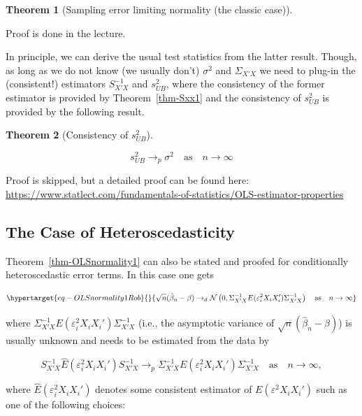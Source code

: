 \documentclass[
  letterpaper,
  DIV=11,
  numbers=noendperiod]{scrreprt}
\theoremstyle{definition}
\theoremstyle{plain}
\newtheorem{theorem}{Theorem}[chapter]
\theoremstyle{plain}
\theoremstyle{remark}
\begin{document}
{\begin{theorem}[Sampling error limiting normality (the classic
case)]
\end{theorem}

Proof is done in the lecture.

In principle, we can derive the usual test statistics from the latter
result. Though, as long as we do not know (we usually don't)
\(\sigma^2\) and \(\Sigma_{X'X}\) we need to plug-in the (consistent!)
estimators \(S_{X'X}^{-1}\) and \(s_{UB}^2\), where the consistency of
the former estimator is provided by Theorem~\ref{thm-Sxx1} and the
consistency of \(s_{UB}^2\) is provided by the following result.

\leavevmode{}%
\begin{theorem}[Consistency of \(s^2_{UB}\)]\label{thm-Consistency_s1}

\[s_{UB}^2\to_{p}\sigma^2\quad\text{as}\quad n\to\infty\]

\end{theorem}

Proof is skipped, but a detailed proof can be found here:
\url{https://www.statlect.com/fundamentals-of-statistics/OLS-estimator-properties}

\hypertarget{the-case-of-heteroscedasticity}{%
\subsection{The Case of
Heteroscedasticity}\label{the-case-of-heteroscedasticity}}

Theorem~\ref{thm-OLSnormality1} can also be stated and proofed for
conditionally heteroscedastic error terms. In this case one gets

\begin{equation}\protect\hypertarget{eq-OLSnormality1Rob}{}{
\sqrt{n}(\hat\beta_n-\beta)\to_{d} \mathcal{N}\left(0,\Sigma_{X'X}^{-1}E(\varepsilon^2_iX_iX_i')\Sigma_{X'X}^{-1}\right)\quad\text{as}\quad n\to\infty
}\label{eq-OLSnormality1Rob}\end{equation}

where \(\Sigma_{X'X}^{-1}E(\varepsilon_i^2X_iX_i')\Sigma_{X'X}^{-1}\)
(i.e., the asymptotic variance of \(\sqrt{n}(\hat\beta_n-\beta)\)) is
usually unknown and needs to be estimated from the data by

\[
S_{X'X}^{-1}\widehat{E}(\varepsilon^2_iX_iX_i')S^{-1}_{X'X}\to_{p} \Sigma_{X'X}^{-1}E(\varepsilon^2_iX_iX_i')\Sigma_{X'X}^{-1}\quad\text{as}\quad n\to\infty,
\]

where \(\widehat{E}(\varepsilon^2_iX_iX_i')\) denotes some consistent
estimator of \(E(\varepsilon^2X_iX_i')\) such as one of the following
choices:

}
\end{document}
